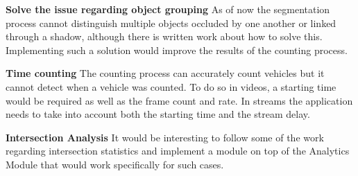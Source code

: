 \textbf{Solve the issue regarding object grouping} As of now the segmentation process cannot distinguish multiple objects occluded by one another or linked through a shadow, although there is written work about how to solve this. Implementing such a solution would improve the results of the counting process.

\textbf{Time counting} The counting process can accurately count vehicles but it cannot detect when a vehicle was counted. To do so in videos, a starting time would be required as well as the frame count and rate. In streams the application needs to take into account both the starting time and the stream delay.

\textbf{Intersection Analysis} It would be interesting to follow some of the work regarding intersection statistics and implement a module on top of the Analytics Module that would work specifically for such cases.

